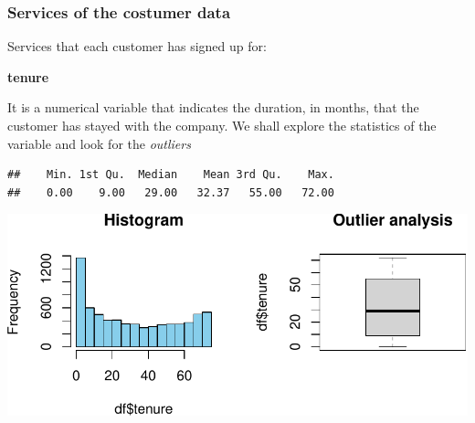\documentclass[
  twoside]{article}
\newenvironment{Shaded}{\begin{snugshade}}{\end{snugshade}}
\newcommand{\AttributeTok}[1]{\textcolor[rgb]{0.77,0.63,0.00}{#1}}
\newcommand{\CommentTok}[1]{\textcolor[rgb]{0.56,0.35,0.01}{\textit{#1}}}
\newcommand{\DecValTok}[1]{\textcolor[rgb]{0.00,0.00,0.81}{#1}}
\newcommand{\FloatTok}[1]{\textcolor[rgb]{0.00,0.00,0.81}{#1}}
\newcommand{\FunctionTok}[1]{\textcolor[rgb]{0.00,0.00,0.00}{#1}}
\newcommand{\NormalTok}[1]{#1}
\newcommand{\OtherTok}[1]{\textcolor[rgb]{0.56,0.35,0.01}{#1}}
\newcommand{\SpecialCharTok}[1]{\textcolor[rgb]{0.00,0.00,0.00}{#1}}
\newcommand{\StringTok}[1]{\textcolor[rgb]{0.31,0.60,0.02}{#1}}
\begin{document}
\hypertarget{services-of-the-costumer-data}{%
\subsubsection{\texorpdfstring{\textbf{Services of the costumer
data}}{Services of the costumer data}}\label{services-of-the-costumer-data}}

Services that each customer has signed up for:

\textbf{tenure}

It is a numerical variable that indicates the duration, in months, that
the customer has stayed with the company. We shall explore the
statistics of the variable and look for the \emph{outliers}

\begin{verbatim}
##    Min. 1st Qu.  Median    Mean 3rd Qu.    Max. 
##    0.00    9.00   29.00   32.37   55.00   72.00
\end{verbatim}

\includegraphics{Assigment2_files/figure-latex/unnamed-chunk-9-1.pdf}

\begin{Shaded}
\end{Shaded}
\end{document}
